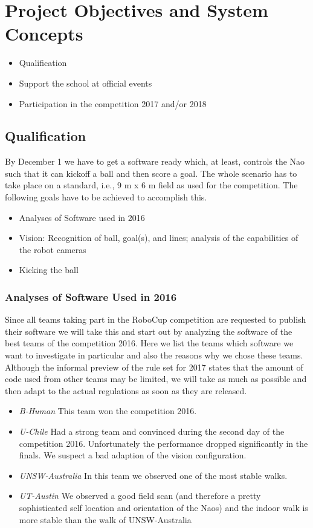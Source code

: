 \documentclass[12pt]{article}
\theoremstyle{definition}
\begin{document}
\section{Project Objectives and System Concepts}
\begin{itemize}
	\item Qualification
	\item Support the school at official events 
	\item Participation in the competition 2017 and/or 2018
\end{itemize}


\subsection{Qualification}
By December 1 we have to get a software ready which, at least, controls the Nao such that it can kickoff a ball and then score a goal. The whole scenario has to take place on a standard, i.e., 9 m x 6 m field as used for the competition. The following goals have to be achieved to accomplish this.
\begin{itemize}
	\item Analyses of Software used in 2016
	\item Vision: Recognition of ball, goal(s), and lines; analysis of the capabilities of the robot cameras
	\item Kicking the ball
\end{itemize}

\subsubsection{Analyses of Software Used in 2016}
Since all teams taking part in the RoboCup competition are requested to publish their software we will take this and start out by analyzing the software of the best teams of the competition 2016. Here we list the teams which software we want to investigate in particular and also the reasons why we chose these teams. Although the informal preview of the rule set for 2017 states that the amount of code used from other teams may be limited, we will take as much as possible and then adapt to the actual regulations as soon as they are released.

\begin{itemize}
	\item {\em B-Human} This team won the competition 2016.
	\item {\em U-Chile} Had a strong team and convinced during the second day of the competition 2016. Unfortunately the performance dropped significantly in the finals. We suspect a bad adaption of the vision configuration.
	\item {\em UNSW-Australia} In this team we observed one of the most stable walks.
	\item {\em UT-Austin} We observed a  good field scan (and therefore a pretty sophisticated self location and orientation of the Naos) and the indoor walk is more stable than the walk of UNSW-Australia
\end{itemize}
\end{document}
